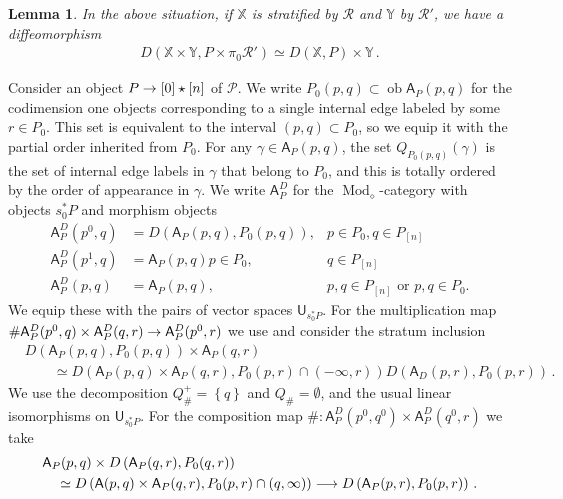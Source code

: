 \documentclass[10pt]{amsart}
\numberwithin{equation}{section}
\newtheorem{lem}[prop]{Lemma}
\theoremstyle{definition}
\DeclareMathOperator{\Mod}{Mod}
\DeclareMathOperator{\ob}{ob}
\newcommand{\bX}{\mathbb{X}}
\newcommand{\bY}{\mathbb{Y}}
\newcommand{\cP}{\mathcal{P}}
\newcommand{\cR}{\mathcal{R}}
\newcommand{\sfA}{\mathsf{A}}
\newcommand{\sfU}{\mathsf{U}}
\newcommand{\join}{\star}
\renewcommand{\to}{\mathchoice{\longrightarrow}{\rightarrow}{}{}}
\begin{document}
\begin{lem}\label{lem:D(XP)_monoidal}
	In the above situation, if $\bX$ is stratified by $\cR$ and $\bY$ by $\cR'$, we have a diffeomorphism
	\begin{align*}
		D(\bX\times \bY, P\times \pi_{0}\cR') \simeq D(\bX, P) \times \bY \,.
	\end{align*}
\end{lem}

Consider an object $P\to [0]\join [n]$ of $\cP$. We write $P_{0}(p,q)\subset \ob\sfA_{P}(p,q)$ for the codimension one objects corresponding to a single internal edge labeled by some $r\in P_{0}$.
This set is equivalent to the interval $(p,q)\subset P_{0}$, so we equip it with the partial order inherited from $P_{0}$.
For any $\gamma \in \sfA_{P}(p,q)$, the set $Q_{P_{0}(p,q)}(\gamma)$ is the set of internal edge labels in $\gamma$ that belong to  $P_{0}$, and this is totally ordered by the order of appearance in $\gamma$.
We write $\sfA_{P}^{D}$ for the $\Mod_{\diamond}$-category with objects $s_{0}^{*}P$ and morphism objects
\begin{align*}
	\sfA_{P}^{D}(p^{0},q) &= D(\sfA_{P}(p,q), P_{0}(p,q)), & p \in P_{0}, q\in P_{[n]} \\
	\sfA_{P}^{D}(p^{1},q) &= \sfA_{P}(p,q)  p\in P_{0},& q\in P_{[n]} \\
	\sfA_{P}^{D}(p,q) &= \sfA_{P}(p,q), &  p,q\in P_{[n]} \text{ or } p,q\in P_{0}.
\end{align*}
We equip these with the pairs of vector spaces $\sfU_{s_{0}^{*}P}$.
For the multiplication map $\# \sfA_{P}^{D}(p^{0},q) \times \sfA_{P}^{D}(q,r) \to \sfA_{P}^{D}(p^{0},r) $ we use  and consider the stratum inclusion
\begin{align*}
	&D\left(\sfA_{P}(p,q), P_{0}(p,q)  \right) \times \sfA_{P}(q,r) \\
	&\qquad \simeq D\left(\sfA_{P}(p,q)\times \sfA_{P}(q,r), P_{0}(p,r)\cap (-\infty,r) \right)  D\left(\sfA_{D}(p,r), P_{0}(p,r) \right) \,.
\end{align*}
We use the decomposition $Q_{\#}^{+} = \left\{ q \right\}$ and $Q_{\#}=\emptyset$, and the usual linear isomorphisms on $\sfU_{s_{0}^{*}P}$. For the composition map $\# \colon \sfA_{P}^{D}(p^{0},q^{0}) \times \sfA_{P}^{D}(q^{0},r)$ we take
\begin{align*}
	&\sfA_{P}(p,q) \times D\left(\sfA_{P}(q,r), P_{0}(q,r)\right) \\
	&\quad \simeq D\left(\sfA(p,q)\times \sfA_{P}(q,r), P_{0}(p,r)\cap (q,\infty)  \right) \to D\left(\sfA_{P}(p,r), P_{0}(p,r) \right)\,.
\end{align*}
\end{document}
